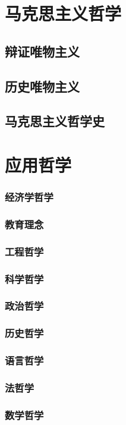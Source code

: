 \documentclass[UTF8]{../RepresentationUniverse}
\begin{document}
\chapter{马克思主义哲学}
    \section{辩证唯物主义}
    \section{历史唯物主义}
    \section{马克思主义哲学史}




\chapter{应用哲学}
    \subsection{经济学哲学}
    \subsection{教育理念}
    \subsection{工程哲学}
    \subsection{科学哲学}
    \subsection{政治哲学}
    \subsection{历史哲学}
    \subsection{语言哲学}
    \subsection{法哲学}
    \subsection{数学哲学}
\end{document}
